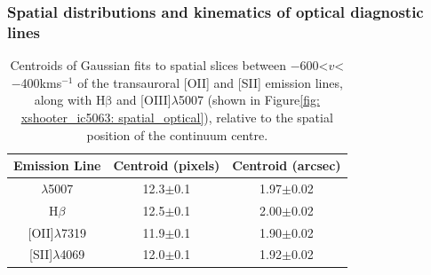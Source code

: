 \subsubsection{Spatial distributions and kinematics of optical diagnostic lines}
\label{section: xshooter_ic5063: properties_of_outflowing_gas: uvb_vis_analysis_and_results: spatial_distributions}

\begin{table}
    \vspace*{1cm}
	\centering
	\renewcommand{\arraystretch}{1.5}
	\begin{tabular}{ccc}
	Emission Line           &  Centroid (pixels) & Centroid (arcsec) \\ \hline
	[OIII]$\lambda$5007 & 12.3$\pm$0.1                                                                                                       & 1.97$\pm$0.02                                                                                                             \\
	H$\beta$                & 12.5$\pm$0.1                                                                                                       & 2.00$\pm$0.02                                                                                                             \\
	{[}OII{]}$\lambda$7319  & 11.9$\pm$0.1                                                                                                       & 1.90$\pm$0.02                                                                                                             \\
	{[}SII{]}$\lambda$4069  & 12.0$\pm$0.1                                                                                                       & 1.92$\pm$0.02                                                                                                            
	\end{tabular} \\
	\caption[The spatial positions of the peak flux of the blue wings of the transauroral {[}OII{]} and {[}SII{]} lines, in addition to {[}OIII{]}$\lambda5007$ and H$\beta$ lines]{Centroids of Gaussian fits to spatial slices between \mbox{$-$600\;\textless\;$v$\;\textless\;$-$400\;km\;s$^{-1}$} of the transauroral [OII] and [SII] emission lines, along with H$\mathrm{\beta}$ and [OIII]$\lambda$5007 (shown in Figure\;\ref{fig: xshooter_ic5063: spatial_optical}), relative to the spatial position of the continuum centre.}
	\label{tab: xshooter_ic5063: spatial_vis}
\end{table}

